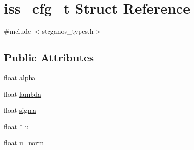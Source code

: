 \hypertarget{structiss__cfg__t}{
\section{iss\_\-cfg\_\-t Struct Reference}
\label{structiss__cfg__t}
}


{\ttfamily \#include $<$steganos\_\-types.h$>$}\subsection*{Public Attributes}
\begin{DoxyCompactItemize}
\item 
float \hyperlink{structiss__cfg__t_a4b16d3ece6ea692acf197f2df92c3ac9}{alpha}
\item 
float \hyperlink{structiss__cfg__t_afac615d52acc232cc5faaa99c4409634}{lambda}
\item 
float \hyperlink{structiss__cfg__t_ae21a5aff11ee728a5ad9d7820590361c}{sigma}
\item 
float $\ast$ \hyperlink{structiss__cfg__t_ac26b5cb58083c80240bc55c19d890cc9}{u}
\item 
float \hyperlink{structiss__cfg__t_a623850599b3c5314183412e955e41464}{u\_\-norm}
\end{DoxyCompactItemize}


